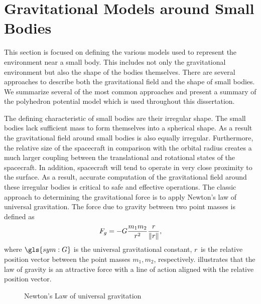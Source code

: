 \section{Gravitational Models around Small Bodies}\label{sec:gravitational_models}
This section is focused on defining the various models used to represent the environment near a small body.
This includes not only the gravitational environment but also the shape of the bodies themselves.
There are several approaches to describe both the gravitational field and the shape of small bodies.
We summarize several of the most common approaches and present a summary of the polyhedron potential model which is used throughout this dissertation.

The defining characteristic of small bodies are their irregular shape.
The small bodies lack sufficient mass to form themselves into a spherical shape.
As a result the gravitational field around small bodies is also equally irregular.
Furthermore, the relative size of the spacecraft in comparison with the orbital radius creates a much larger coupling between the translational and rotational states of the spacecraft.
In addition, spacecraft will tend to operate in very close proximity to the surface.
As a result, accurate computation of the gravitational field around these irregular bodies is critical to safe and effective operations.
The classic approach to determining the gravitational force is to apply Newton's law of universal gravitation.
The force due to gravity between two point masses is defined as
\begin{align}\label{eq:newton_universal_gravitation}
    F_g =  - G \frac{m_1 m_2}{r^2} \frac{r}{\left\| r \right\|},
\end{align}
where \( \gls{sym:G} \) is the universal gravitational constant, \( r \) is the relative position vector between the point masses \( m_1, m_2\), respectively.
 illustrates that the law of gravity is an attractive force with a line of action aligned with the relative position vector.
\begin{figure}
    \centering
    
    \caption{Newton's Law of universal gravitation~\label{fig:universal_gravity}}
\end{figure}

